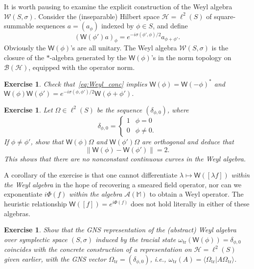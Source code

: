 \documentclass[12pt]{article}
\newcommand{\1}{\mathds{1}}                         %
\newcommand{\Hcal}{\mathcal {H}}
\newcommand{\MM}{\mathbb{M}}
\newcommand{\BB}{{\mathcal{B}}}
\newcommand{\HH}{{\mathcal{H}}}
\newcommand{\Ac}{{\mathcal{A}}}
\newcommand{\Wc}{{\mathcal{W}}}
\newcommand{\Ws}{{\mathsf{W}}}
\newcommand{\ip}[2]{\langle #1|#2\rangle}
\newtheorem{exercise}[theorem]{Exercise}
\begin{document}
	It is worth pausing to examine the explicit construction of the Weyl algebra $\Wc(S,\sigma)$.  Consider
	the (inseparable) Hilbert space $\HH=\ell^2(S)$
	of square-summable sequences $a=(a_\phi)$ indexed by $\phi\in S$, and define
	\begin{equation}\label{eq:Weyl_conc}
	(\Ws(\phi')a)_\phi = e^{-i\sigma(\phi',\phi)/2} a_{\phi+\phi'}.
	\end{equation}
	Obviously the $\Ws(\phi)$'s are all unitary. 
	The Weyl algebra $\Wc(S,\sigma)$ is the closure of the $*$-algebra generated by the $\Ws(\phi)$'s in the norm topology on $\BB(\HH)$, equipped with the operator norm.
	

	\begin{exercise}
		Check that~\eqref{eq:Weyl_conc} implies $\Ws(\phi)=\Ws(-\phi)^*$ and $\Ws(\phi)\Ws(\phi') = e^{-i\sigma(\phi,\phi')/2}\Ws(\phi+\phi')$.
	\end{exercise} 
	\begin{exercise}
		Let $\Omega\in\ell^2(S)$ be the sequence $(\delta_{\phi,0})$, where
		\[
		\delta_{\phi,0}= \begin{cases}
		1 & \phi=0\\ 0 & \phi\neq 0.
		\end{cases} 
		\]
		If $\phi\neq\phi'$, show that
		$\Ws(\phi)\Omega$ and $\Ws(\phi')\Omega$ are orthogonal and deduce that 
		\[
		\|\Ws(\phi)-\Ws(\phi')\| =2.
		\]
		This shows that there are no nonconstant continuous curves in the Weyl algebra.
	\end{exercise}
	A corollary of the exercise is that one cannot differentiate $\lambda\mapsto \Ws([\lambda f])$ \emph{within the Weyl algebra} in the hope of recovering a smeared field operator, nor can we exponentiate $i\Phi(f)$ \emph{within the algebra $\Ac(\MM)$} to obtain a Weyl operator. The heuristic relationship 
	$\Ws([f]) = e^{i\Phi(f)}$ does not hold literally in either of these algebras. 
\begin{exercise}
		Show that the GNS representation of the (abstract) Weyl algebra over symplectic space $(S,\sigma)$ induced by the \emph{tracial state} $\omega_{\text{tr}}(\Ws(\phi)) = \delta_{\phi,0}$ 
		coincides with the concrete construction of a representation on $\Hcal=\ell^2(S)$
		given earlier, with the GNS vector   $\Omega_{\text{tr}}=(\delta_{\phi,0})$,  i.e., $\omega_{\text{tr}}(A)=\ip{\Omega_{\text{tr}}}{A\Omega_{\text{tr}}}$. 
	\end{exercise}
	
\end{document}
